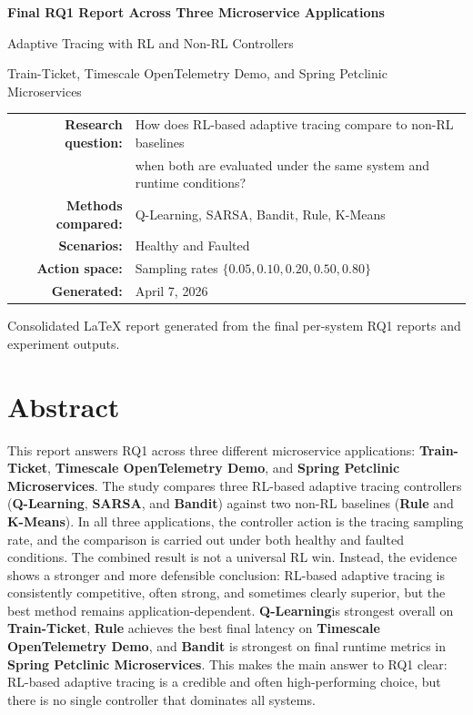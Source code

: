\documentclass[11pt]{report}
\newcommand{\QL}{\textbf{Q-Learning}}
\newcommand{\SARSA}{\textbf{SARSA}}
\newcommand{\Bandit}{\textbf{Bandit}}
\newcommand{\Rule}{\textbf{Rule}}
\newcommand{\KMeans}{\textbf{K-Means}}
\newcommand{\TT}{\textbf{Train-Ticket}}
\newcommand{\TS}{\textbf{Timescale OpenTelemetry Demo}}
\newcommand{\SP}{\textbf{Spring Petclinic Microservices}}
\begin{document}
\begin{titlepage}
    \centering
    \vspace*{2cm}
    {\Huge\bfseries Final RQ1 Report Across Three Microservice Applications\par}
    \vspace{0.6cm}
    {\Large Adaptive Tracing with RL and Non-RL Controllers\par}
    \vspace{1.4cm}
    {\large Train-Ticket, Timescale OpenTelemetry Demo, and Spring Petclinic Microservices\par}
    \vspace{2cm}
    \begin{tabular}{rl}
        \textbf{Research question:} & How does RL-based adaptive tracing compare to non-RL baselines \\
        & when both are evaluated under the same system and runtime conditions? \\
        \textbf{Methods compared:} & Q-Learning, SARSA, Bandit, Rule, K-Means \\
        \textbf{Scenarios:} & Healthy and Faulted \\
        \textbf{Action space:} & Sampling rates $\{0.05, 0.10, 0.20, 0.50, 0.80\}$ \\
        \textbf{Generated:} & April 7, 2026 \\
    \end{tabular}
    \vfill
    {\large Consolidated LaTeX report generated from the final per-system RQ1 reports and experiment outputs.\par}
\end{titlepage}

\tableofcontents
\clearpage

\chapter*{Abstract}
This report answers RQ1 across three different microservice applications: \TT, \TS, and \SP. The study compares three RL-based adaptive tracing controllers (\QL, \SARSA, and \Bandit) against two non-RL baselines (\Rule{} and \KMeans{}). In all three applications, the controller action is the tracing sampling rate, and the comparison is carried out under both healthy and faulted conditions. The combined result is not a universal RL win. Instead, the evidence shows a stronger and more defensible conclusion: RL-based adaptive tracing is consistently competitive, often strong, and sometimes clearly superior, but the best method remains application-dependent. \QL is strongest overall on \TT, \Rule{} achieves the best final latency on \TS, and \Bandit{} is strongest on final runtime metrics in \SP. This makes the main answer to RQ1 clear: RL-based adaptive tracing is a credible and often high-performing choice, but there is no single controller that dominates all systems.
\end{document}
